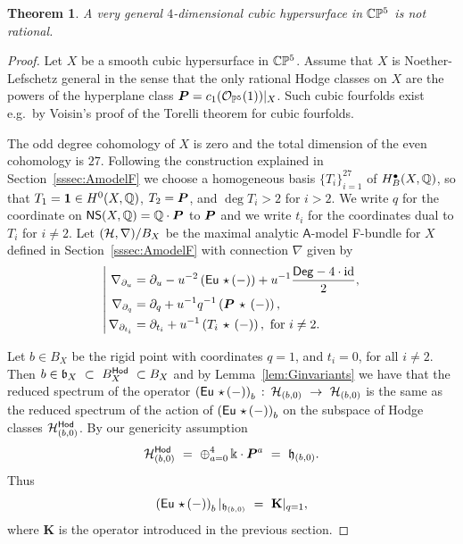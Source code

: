\documentclass[twoside,leqno]{article}
\numberwithin{equation}{section}
\theoremstyle{plain}
\newtheorem{theorem}[equation]{Theorem}
\theoremstyle{definition}
\begin{document}
\begin{theorem} \label{thm:cubic4} 
A very general $4$-dimensional cubic hypersurface in $\mathbb C\mathbb P^5$ is not rational.
\end{theorem}
\begin{proof}
Let $X$ be a smooth cubic hypersurface in $\mathbb C\mathbb P^5$. Assume that $X$ is Noether-Lefschetz general in the sense that the only rational Hodge classes on $X$ are  the powers of the hyperplane class  $\boldsymbol{P} = c_{1}(\mathcal O_{\mathbb P^5}(1))|_{X}$. Such cubic fourfolds exist e.g.\ by Voisin's proof \cite{Voisin-cubicTorelli} of the Torelli theorem for cubic fourfolds.

The odd degree cohomology of $X$ is zero and the total dimension of the even cohomology is $27$. Following the construction explained in Section~\ref{sssec:AmodelF} we choose a homogeneous basis $\{T_{i}\}_{i = 1}^{27}$ of $H^{\bullet}_{B}(X,\mathbb Q)$, so that $T_{1} = \mathbf{1} \in H^0(X,\mathbb Q)$, $T_{2} = \boldsymbol{P}$, and $\deg T_{i} > 2$ for $i > 2$.  We write $q$ for the coordinate on $\mathsf{NS}(X,\mathbb Q) = \mathbb Q\cdot \boldsymbol{P}$ to $\boldsymbol{P}$ and we write $t_{i}$ for the coordinates dual to $T_{i}$ for $i \neq 2$. 
Let $(\mathcal H,\nabla)/B_{X}$ be the maximal analytic ${\mathsf A}$-model F-bundle for $X$ defined in Section~\ref{sssec:AmodelF} with connection $\nabla$ given by 
\begin{equation} \label{eq:cubicnabla}
\left| \,
\begin{aligned}
\nabla_{\partial_{u}} & = \partial_{u} - u^{-2} \left(\operatorname{\mathsf{Eu}} \, \star\, (-)\right) + u^{-1} \frac{\mathsf{Deg} - 4\cdot \operatorname{id}}{2}, \\
\nabla_{\partial_{q}} & = \partial_{q} + u^{-1}q^{-1} \left( \boldsymbol{P} \, \star \, (-)\right), \\
\nabla_{\partial_{t_{i}}} & = \partial_{t_{i}} + u^{-1} \left( T_{i} \, \star \, (-)\right), \ \text{for} \ i \neq 2.
\end{aligned}
\right.
\end{equation}

Let $b \in B_{X}$ be the rigid point with coordinates $q = 1$, and $t_{i} = 0$, for all $i \neq 2$. Then $b \in \smallbase_{X} \ \subset \ B_{X}^{\hodge} \ \subset B_{X}$ and 
by Lemma~\ref{lem:Ginvariants} we have that the reduced spectrum of the operator 
$\left(\Eu \, \qup\, (-)\right)_{b} \, \colon \, \cH_{(b,0)} \ \to \ \cH_{(b,0)}$ is the same as the reduced spectrum of the action of $\left(\operatorname{\mathsf{Eu}} \, \star\, (-)\right)_{b}$ on the subspace 
of Hodge classes $\mathcal H^{\mathsf{Hod}}_{(b,0)}$. By our genericity assumption 
\[
\cH^{\hodge}_{(b,0)} \ = \ \oplus_{a = 0}^4 \, \bbk\cdot \hpl^{a} \ = \ \smallfiber_{(b,0)}.
\]
Thus 
\[
\left(\operatorname{\mathsf{Eu}} \, \star\, (-)\right)_{b}|_{\mathfrak{h}_{(b,0)}} \ = \ \mathbf{K}|_{q=1},
\]
where $\mathbf{K}$ is the operator introduced in the previous section. 


\end{proof}
\end{document}

